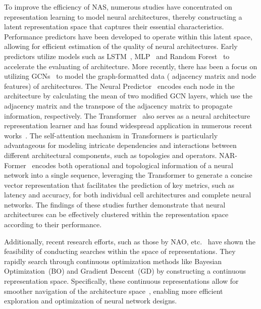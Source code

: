 \documentclass[../main.tex]{subfiles}
\begin{document}
To improve the efficiency of NAS, numerous studies have concentrated on representation learning to model neural architectures, thereby constructing a latent representation space that captures their essential characteristics.
Performance predictors have been developed to operate within this latent space, allowing for efficient estimation of the quality of neural architectures.
Early predictors utilize models such as LSTM~\cite{DBLP:journals/corr/abs-1712-03351,DBLP:conf/eccv/LiuZNSHLFYHM18,DBLP:conf/nips/LuoTQCL18}, MLP~\cite{DBLP:conf/cvpr/Xu00TJX021,DBLP:conf/aaai/WhiteNS21} and Random Forest~\cite{DBLP:journals/tec/SunWXJYZ20} to accelerate the evaluating of architecture.
More recently, there has been a focus on utilizing GCNs~\cite{DBLP:conf/cvpr/ChenGCLZWT21,DBLP:conf/aaai/LiGZ20,DBLP:conf/nips/ShiPXLKZ20,DBLP:conf/eccv/WenLCLBK20,DBLP:conf/ijcnn/LukasikFZHK21} to model the graph-formatted data (\eg{} adjacency matrix and node features) of architectures.
The Neural Predictor~\cite{DBLP:conf/eccv/WenLCLBK20} encodes each node in the architecture by calculating the mean of two modified GCN layers, which use the adjacency matrix and the transpose of the adjacency matrix to propagate information, respectively.
The Transformer~\cite{DBLP:conf/nips/VaswaniSPUJGKP17} also serves as a neural architecture representation learner and has found widespread application in numerous recent works~\cite{DBLP:conf/mm/Guo0HLXY022,DBLP:conf/cvpr/YiZH0023}.
The self-attention mechanism in Transformers is particularly advantageous for modeling intricate dependencies and interactions between different architectural components, such as topologies and operators.
NAR-Former~\cite{DBLP:conf/cvpr/YiZH0023} encodes both operational and topological information of a neural network into a single sequence, leveraging the Transformer to generate a concise vector representation that facilitates the prediction of key metrics, such as latency and accuracy, for both individual cell architectures and complete neural networks.
The findings of these studies further demonstrate that neural architectures can be effectively clustered within the representation space according to their performance.

Additionally, recent research efforts, such as those by NAO, etc.~\cite{DBLP:conf/nips/LuoTQCL18,DBLP:conf/nips/YanZAZ020,DBLP:conf/ijcnn/LukasikFZHK21} have shown the feasibility of conducting searches within the space of representations.
They rapidly search through continuous optimization methods like Bayesian Optimization~(BO) and Gradient Descent~(GD) by constructing a continuous representation space.
Specifically, these continuous representations allow for smoother navigation of the architecture space~\cite{DBLP:conf/ijcnn/LukasikFZHK21}, enabling more efficient exploration and optimization of neural network designs.
\end{document}
